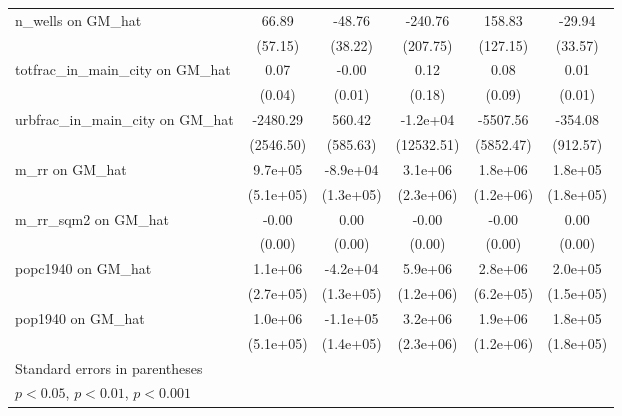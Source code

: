 \begin{table}[htbp]
\begin{tabular}{l*{5}{c}}
\addlinespace
n\_wells on GM\_hat&    66.89         &   -48.76         &  -240.76         &   158.83         &   -29.94         \\
                &  (57.15)         &  (38.22)         & (207.75)         & (127.15)         &  (33.57)         \\
\addlinespace
totfrac\_in\_main\_city on GM\_hat&     0.07         &    -0.00         &     0.12         &     0.08         &     0.01         \\
                &   (0.04)         &   (0.01)         &   (0.18)         &   (0.09)         &   (0.01)         \\
\addlinespace
urbfrac\_in\_main\_city on GM\_hat& -2480.29         &   560.42         & -1.2e+04         & -5507.56         &  -354.08         \\
                &(2546.50)         & (585.63)         &(12532.51)         &(5852.47)         & (912.57)         \\
\addlinespace
m\_rr on GM\_hat  &  9.7e+05         & -8.9e+04         &  3.1e+06         &  1.8e+06         &  1.8e+05         \\
                &(5.1e+05)         &(1.3e+05)         &(2.3e+06)         &(1.2e+06)         &(1.8e+05)         \\
\addlinespace
m\_rr\_sqm2 on GM\_hat&    -0.00         &     0.00\sym{***}&    -0.00         &    -0.00         &     0.00         \\
                &   (0.00)         &   (0.00)         &   (0.00)         &   (0.00)         &   (0.00)         \\
\addlinespace
popc1940 on GM\_hat&  1.1e+06\sym{***}& -4.2e+04         &  5.9e+06\sym{***}&  2.8e+06\sym{***}&  2.0e+05         \\
                &(2.7e+05)         &(1.3e+05)         &(1.2e+06)         &(6.2e+05)         &(1.5e+05)         \\
\addlinespace
pop1940 on GM\_hat&  1.0e+06\sym{*}  & -1.1e+05         &  3.2e+06         &  1.9e+06         &  1.8e+05         \\
                &(5.1e+05)         &(1.4e+05)         &(2.3e+06)         &(1.2e+06)         &(1.8e+05)         \\
\bottomrule
\multicolumn{6}{l}{\footnotesize Standard errors in parentheses}\\
\multicolumn{6}{l}{\footnotesize \sym{*} \(p<0.05\), \sym{**} \(p<0.01\), \sym{***} \(p<0.001\)}\\
\end{tabular}
\end{table}
